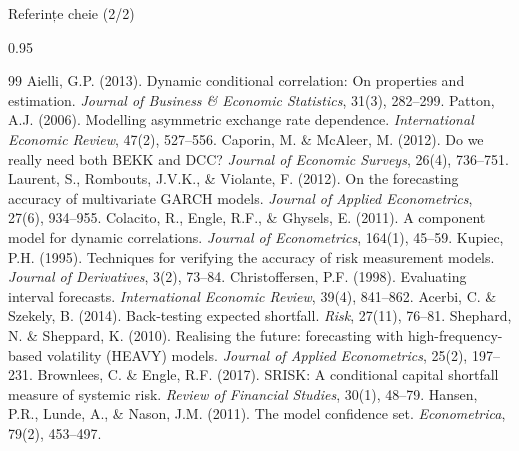 \documentclass[9pt, aspectratio=169, t]{beamer}
\begin{document}
\begin{frame}{Referințe cheie (2/2)}
    \begin{cminipage}{0.95\textwidth}
    \vspace{-3mm}
    {\tiny
    \begin{thebibliography}{99}\setlength{\itemsep}{0pt}
         Aielli, G.P. (2013). Dynamic conditional correlation: On properties and estimation. \textit{Journal of Business \& Economic Statistics}, 31(3), 282--299.
         Patton, A.J. (2006). Modelling asymmetric exchange rate dependence. \textit{International Economic Review}, 47(2), 527--556.
         Caporin, M. \& McAleer, M. (2012). Do we really need both BEKK and DCC? \textit{Journal of Economic Surveys}, 26(4), 736--751.
         Laurent, S., Rombouts, J.V.K., \& Violante, F. (2012). On the forecasting accuracy of multivariate GARCH models. \textit{Journal of Applied Econometrics}, 27(6), 934--955.
         Colacito, R., Engle, R.F., \& Ghysels, E. (2011). A component model for dynamic correlations. \textit{Journal of Econometrics}, 164(1), 45--59.
         Kupiec, P.H. (1995). Techniques for verifying the accuracy of risk measurement models. \textit{Journal of Derivatives}, 3(2), 73--84.
         Christoffersen, P.F. (1998). Evaluating interval forecasts. \textit{International Economic Review}, 39(4), 841--862.
         Acerbi, C. \& Szekely, B. (2014). Back-testing expected shortfall. \textit{Risk}, 27(11), 76--81.
         Shephard, N. \& Sheppard, K. (2010). Realising the future: forecasting with high-frequency-based volatility (HEAVY) models. \textit{Journal of Applied Econometrics}, 25(2), 197--231.
         Brownlees, C. \& Engle, R.F. (2017). SRISK: A conditional capital shortfall measure of systemic risk. \textit{Review of Financial Studies}, 30(1), 48--79.
         Hansen, P.R., Lunde, A., \& Nason, J.M. (2011). The model confidence set. \textit{Econometrica}, 79(2), 453--497.
    \end{thebibliography}
    }
    \end{cminipage}
\end{frame}
\end{document}
